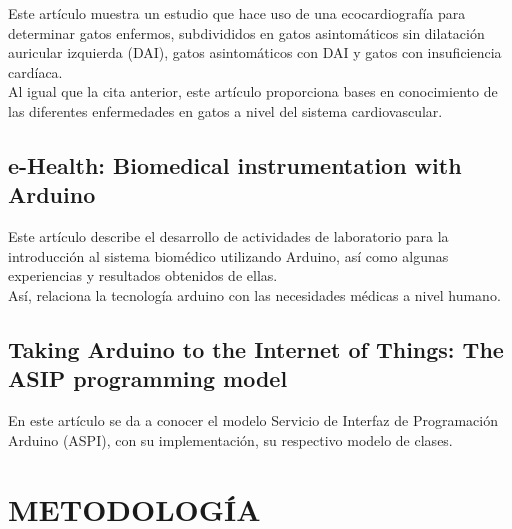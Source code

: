 \documentclass[letterpaper, 10 pt, conference]{ieeeconf}  %
\begin{document}
Este art\'iculo muestra un estudio que hace uso de una ecocardiograf\'ia para determinar gatos enfermos, subdivididos en gatos asintom\'aticos sin dilataci\'on auricular izquierda (DAI), gatos asintom\'aticos con DAI y gatos con insuficiencia card\'iaca.\\ %

Al igual que la cita anterior, este art\'iculo proporciona bases en conocimiento de las diferentes enfermedades en gatos a nivel del sistema cardiovascular.

\subsection{e-Health: Biomedical instrumentation with Arduino \cite{c5}}

Este art\'iculo describe  el desarrollo de actividades de laboratorio para la introducci\'on al sistema biom\'edico utilizando Arduino, as\'i como algunas experiencias y resultados obtenidos de ellas.\\

As\'i, relaciona la tecnolog\'ia arduino con las necesidades m\'edicas a nivel humano.


\subsection{Taking Arduino to the Internet of Things: The ASIP programming model \cite{c6}}

En este art\'iculo se da a conocer el modelo Servicio de Interfaz de Programaci\'on Arduino (ASPI), con su implementaci\'on, su respectivo modelo de clases.





\section{METODOLOG\'IA}
\end{document}
